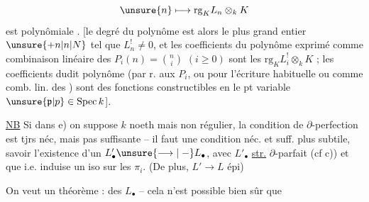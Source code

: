 \[
\unsure{n}\longmapsto\mathrm{rg}_K L_n\otimes_k K
\]
est polynômiale . [le degré du polynôme  est alors le plus grand entier $\unsure{+n|n|N}$ tel que $L_n^!\ne0$, et les coefficients du polynôme exprimé comme combinaison linéaire des $P_i(n)=\binom n i$ $(i\geq0)$ sont les $\mathrm{rg}_K L_i^!\otimes_k K$ ; les coefficients dudit polynôme (par r. aux $P_i$, ou pour l'écriture habituelle  ou comme comb. lin. des ) sont des fonctions constructibles en le pt variable $\unsure{\mathfrak p|p}\in\operatorname{Spec} k$].

\uline{NB} Si dans e) on suppose $k$ noeth mais non régulier, la condition  de $\partial$-perfection est tjrs néc, mais pas suffisante -- il faut une condition néc. et suff. plus subtile, savoir l'existence d'un $L'_\bullet\unsure{\longrightarrow|\mathrel{-}}L_\bullet$, avec $L'_\bullet$ \uline{str.} $\partial$-parfait (cf c)) et que   i.e. induise un iso sur les $\pi_i$. (De plus, \unsure{$\exists\exists$|$\exists$} $L'\to L$ épi)


On veut un théorème : \uline{} \uline{} des $L_\bullet$   -- cela n'est possible bien sûr que 
